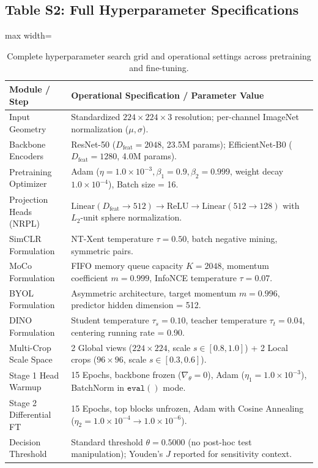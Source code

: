 \documentclass[11pt,a4paper]{article}
\begin{document}
\subsection*{Table S2: Full Hyperparameter Specifications}
\begin{table}[htbp]
\centering
\caption{Complete hyperparameter search grid and operational settings across pretraining and fine-tuning.}
\label{tab:s2_params}
\begin{adjustbox}{max width=\textwidth}
\begin{tabular}{p{4.5cm} p{11.5cm}}
\toprule
\textbf{Module / Step} & \textbf{Operational Specification / Parameter Value} \\
\midrule
Input Geometry & Standardized $224 \times 224 \times 3$ resolution; per-channel ImageNet normalization ($\mu, \sigma$). \\
Backbone Encoders & ResNet-50 ($D_{\text{feat}} = 2048$, 23.5M params); EfficientNet-B0 ($D_{\text{feat}} = 1280$, 4.0M params). \\
Pretraining Optimizer & Adam ($\eta = 1.0 \times 10^{-3}, \beta_1=0.9, \beta_2=0.999$, weight decay $1.0 \times 10^{-4}$), Batch size = 16. \\
Projection Heads (NRPL) & $\text{Linear}(D_{\text{feat}} \to 512) \to \text{ReLU} \to \text{Linear}(512 \to 128)$ with $L_2$-unit sphere normalization. \\
SimCLR Formulation & NT-Xent temperature $\tau = 0.50$, batch negative mining, symmetric pairs. \\
MoCo Formulation & FIFO memory queue capacity $K = 2048$, momentum coefficient $m = 0.999$, InfoNCE temperature $\tau = 0.07$. \\
BYOL Formulation & Asymmetric architecture, target momentum $m = 0.996$, predictor hidden dimension = 512. \\
DINO Formulation & Student temperature $\tau_s = 0.10$, teacher temperature $\tau_t = 0.04$, centering running rate = 0.90. \\
Multi-Crop Scale Space & 2 Global views ($224 \times 224$, scale $s \in [0.8, 1.0]$) + 2 Local crops ($96 \times 96$, scale $s \in [0.3, 0.6]$). \\
Stage 1 Head Warmup & 15 Epochs, backbone frozen ($\nabla_\theta = 0$), Adam ($\eta_1 = 1.0 \times 10^{-3}$), BatchNorm in $\mathtt{eval}()$ mode. \\
Stage 2 Differential FT & 15 Epochs, top blocks unfrozen, Adam with Cosine Annealing ($\eta_2 = 1.0 \times 10^{-4} \to 1.0 \times 10^{-6}$). \\
Decision Threshold & Standard threshold $\theta = 0.5000$ (no post-hoc test manipulation); Youden's $J$ reported for sensitivity context. \\
\bottomrule
\end{tabular}
\end{adjustbox}
\end{table}
\end{document}
